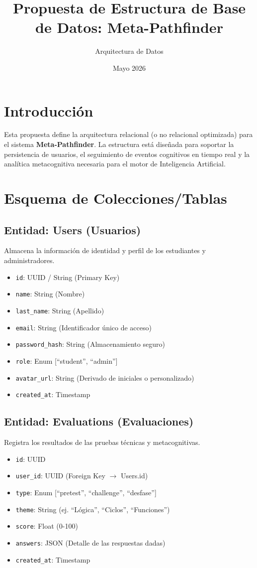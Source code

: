 \documentclass{article}
\title{Propuesta de Estructura de Base de Datos: Meta-Pathfinder}
\author{Arquitectura de Datos}
\date{Mayo 2026}
\begin{document}
\maketitle

\section{Introducción}
Esta propuesta define la arquitectura relacional (o no relacional optimizada) para el sistema \textbf{Meta-Pathfinder}. La estructura está diseñada para soportar la persistencia de usuarios, el seguimiento de eventos cognitivos en tiempo real y la analítica metacognitiva necesaria para el motor de Inteligencia Artificial.

\section{Esquema de Colecciones/Tablas}

\subsection{Entidad: Users (Usuarios)}
Almacena la información de identidad y perfil de los estudiantes y administradores.
\begin{itemize}
    \item \texttt{id}: UUID / String (Primary Key)
    \item \texttt{name}: String (Nombre)
    \item \texttt{last\_name}: String (Apellido)
    \item \texttt{email}: String (Identificador único de acceso)
    \item \texttt{password\_hash}: String (Almacenamiento seguro)
    \item \texttt{role}: Enum [``student'', ``admin'']
    \item \texttt{avatar\_url}: String (Derivado de iniciales o personalizado)
    \item \texttt{created\_at}: Timestamp
\end{itemize}

\subsection{Entidad: Evaluations (Evaluaciones)}
Registra los resultados de las pruebas técnicas y metacognitivas.
\begin{itemize}
    \item \texttt{id}: UUID
    \item \texttt{user\_id}: UUID (Foreign Key $\to$ Users.id)
    \item \texttt{type}: Enum [``pretest'', ``challenge'', ``desfase'']
    \item \texttt{theme}: String (ej. ``Lógica'', ``Ciclos'', ``Funciones'')
    \item \texttt{score}: Float (0-100)
    \item \texttt{answers}: JSON (Detalle de las respuestas dadas)
    \item \texttt{created\_at}: Timestamp
\end{itemize}
\end{document}
